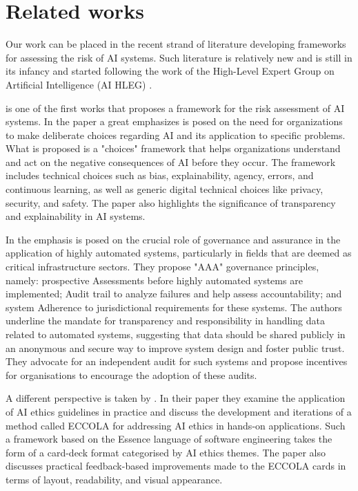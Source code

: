 \section{Related works}
Our work can be placed in the recent strand of literature developing frameworks for assessing the risk of AI systems.
Such literature is relatively new and is still in its infancy and started following the work of the High-Level Expert Group on Artificial Intelligence (AI HLEG) \cite{ec2020}.

\cite{benjamins_2021} is one of the first works that proposes a framework for the risk assessment of AI systems.
In the paper a great emphasizes is posed on the need for organizations to make deliberate choices regarding AI and its application to specific problems. What is proposed is a "choices" framework that helps organizations understand and act on the negative consequences of AI before they occur. The framework includes technical choices such as bias, explainability, agency, errors, and continuous learning, as well as generic digital technical choices like privacy, security, and safety. The paper also highlights the significance of transparency and explainability in AI systems.

In \cite{falco_2021} the emphasis is posed on the crucial role of governance and assurance in the application of highly automated systems, particularly in fields that are deemed as critical infrastructure sectors. They propose "AAA" governance principles, namely: prospective Assessments before highly automated systems are implemented; Audit trail to analyze failures and help assess accountability; and system Adherence to jurisdictional requirements for these systems. The authors underline the mandate for transparency and responsibility in handling data related to automated systems, suggesting that data should be shared publicly in an anonymous and secure way to improve system design and foster public trust. They advocate for an independent audit for such systems and propose incentives for organisations to encourage the adoption of these audits.

A different perspective is taken by \cite{vakkuri_2021}. In their paper they examine the application of AI ethics guidelines in practice and discuss the development and iterations of a method called ECCOLA for addressing AI ethics in hands-on applications. Such a framework based on the Essence language of software engineering takes the form of a card-deck format categorised by AI ethics themes. The paper also discusses practical feedback-based improvements made to the ECCOLA cards in terms of layout, readability, and visual appearance.

